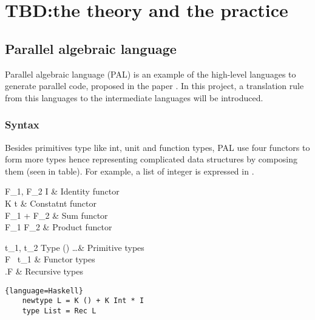 \chapter{TBD:the theory and the practice}
\section{Parallel algebraic language} \label{b:pal}
Parallel algebraic language (PAL) is an example of the high-level languages to generate parallel code, proposed in the paper \cite{authorAlgebraicMultipartyProtocol2018}. In this project, a translation rule from this languages to the intermediate languages will be introduced.
\subsection{Syntax}
Besides primitives type like int, unit and function types, PAL use four functors to form more types hence representing complicated data structures by composing them (seen in table). For example, a list of integer is expressed in .
\begin{table}[ht]
\begin{grammar}{F_1, F_2 \Coloneqq}{}
    I & Identity functor\\
    K t & Constatnt functor\\
    F_1 + F_2 & Sum functor\\
    F_1 \times F_2 & Product functor
\end{grammar}
\hfill
\begin{grammar}{t_1, t_2 \Coloneqq}{Type}
    () \mid {} \mid \dots & Primitive types\\
    F \ t_1 & Functor types\\
    \mu .F & Recursive types\\
\end{grammar}
\caption{Functor and Type definitions}
\end{table}
\begin{code}
\begin{lstlisting}{language=Haskell}
    newtype L = K () + K Int * I
    type List = Rec L
\end{lstlisting}
\caption{Type of integer list in PAL}
\label{p:pal:c1}
\end{code}

